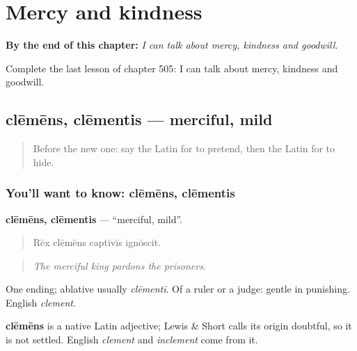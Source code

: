 
\chapter{Mercy and kindness}
\label{ch:la-mercy-and-kindness}

\begin{chapteropening}
\textbf{By the end of this chapter:} \emph{I can talk about mercy, kindness and goodwill.}

Complete the last lesson of chapter 505: I can talk about mercy, kindness and goodwill.
\end{chapteropening}

\section[clēmēns, clēmentis]{clēmēns, clēmentis — merciful, mild}

\label{lesson:LA-C505-clemens}



\begin{quote}
Before the new one: say the Latin for to pretend, then the Latin for to hide.
\end{quote}

\subsection*{You'll want to know: clēmēns, clēmentis}
\textbf{clēmēns, clēmentis} — \textquotedblleft{}merciful, mild\textquotedblright{}.

\begin{quote}
Rēx clēmēns captīvīs ignōscit.
\end{quote}

\begin{quote}
\emph{The merciful king pardons the prisoners.}
\end{quote}

One ending; ablative usually \emph{clēmentī}. Of a ruler or a judge: gentle in punishing. English \emph{clement}.

\begin{cousinweb}
\textbf{clēmēns} is a native Latin adjective; Lewis \& Short calls its origin doubtful, so it is not settled. English \emph{clement} and \emph{inclement} come from it.
\end{cousinweb}

